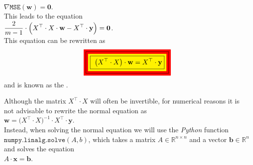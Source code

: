 \\[0.2cm]
\hspace*{1.3cm}
$\nabla \mathtt{MSE}(\mathbf{w}) = \mathbf{0}$.
\\[0.2cm]
This leads to the equation
\\[0.2cm]
\hspace*{1.3cm}
$\displaystyle\frac{2}{m-1} \cdot \Bigl(X^\top \cdot X \cdot \mathbf{w} - X^\top \cdot \mathbf{y}\Bigr) = \mathbf{0}$.
\\[0.2cm]
This equation can be rewritten as
\begin{equation}
  \label{eq:normal-equation}
 \colorbox{red}{\framebox{\colorbox{yellow}{\framebox{
 $\ds\bigl(X^\top \cdot X\bigr) \cdot \mathbf{w} = X^\top \cdot \mathbf{y}$}}}} 
\end{equation}
and is known as the .  

\remark
Although the matrix $X^\top \cdot X$ will often be invertible, for numerical reasons it is not
advisable to rewrite the normal equation as
\\[0.2cm]
\hspace*{1.3cm}
$\mathbf{w} = \bigl(X^\top \cdot X)^{-1} \cdot X^\top \cdot \mathbf{y}$.
\\[0.2cm]
Instead, when solving the normal equation we will use the \textsl{Python} function $\texttt{numpy.linalg.solve}(A,b)$, which
takes a matrix $A \in \mathbb{R}^{n \times n}$ and a vector $\mathbf{b} \in \mathbb{R}^n$ and solves the equation
\\[0.2cm]
\hspace*{1.3cm}
$A \cdot \mathbf{x} = \mathbf{b}$.  \eox

